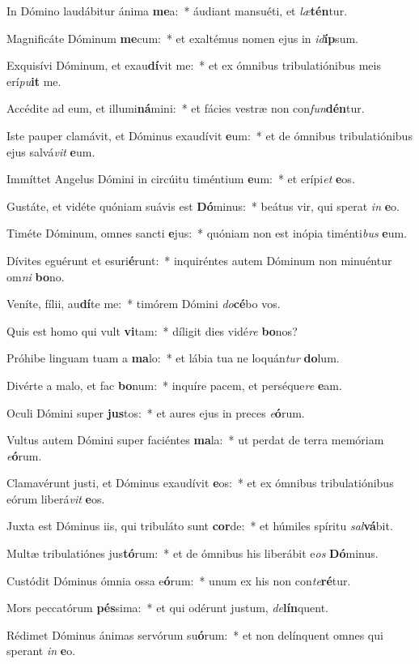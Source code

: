 \item In Dómino laudábitur ánima \textbf{me}a:~* áudiant mansuéti, et \textit{læ}\textbf{tén}tur.
\item Magnificáte Dóminum \textbf{me}cum:~* et exaltémus nomen ejus in \textit{id}\textbf{íp}sum.
\item Exquisívi Dóminum, et exau\textbf{dí}vit me:~* et ex ómnibus tribulatiónibus meis erí\textit{pu}\textbf{it} me.
\item Accédite ad eum, et illumi\textbf{ná}mini:~* et fácies vestræ non con\textit{fun}\textbf{dén}tur.
\item Iste pauper clamávit, et Dóminus exaudívit \textbf{e}um:~* et de ómnibus tribulatiónibus ejus salvá\textit{vit} \textbf{e}um.
\item Immíttet Angelus Dómini in circúitu timéntium \textbf{e}um:~* et erípi\textit{et} \textbf{e}os.
\item Gustáte, et vidéte quóniam suávis est \textbf{Dó}minus:~* beátus vir, qui sperat \textit{in} \textbf{e}o.
\item Timéte Dóminum, omnes sancti \textbf{e}jus:~* quóniam non est inópia timénti\textit{bus} \textbf{e}um.
\item Dívites eguérunt et esuri\textbf{é}runt:~* inquiréntes autem Dóminum non minuéntur om\textit{ni} \textbf{bo}no.
\item Veníte, fílii, au\textbf{dí}te me:~* timórem Dómini \textit{do}\textbf{cé}bo vos.
\item Quis est homo qui vult \textbf{vi}tam:~* díligit dies vidé\textit{re} \textbf{bo}nos?
\item Próhibe linguam tuam a \textbf{ma}lo:~* et lábia tua ne loquán\textit{tur} \textbf{do}lum.
\item Divérte a malo, et fac \textbf{bo}num:~* inquíre pacem, et perséque\textit{re} \textbf{e}am.
\item Oculi Dómini super \textbf{jus}tos:~* et aures ejus in preces \textit{e}\textbf{ó}rum.
\item Vultus autem Dómini super faciéntes \textbf{ma}la:~* ut perdat de terra memóriam \textit{e}\textbf{ó}rum.
\item Clamavérunt justi, et Dóminus exaudívit \textbf{e}os:~* et ex ómnibus tribulatiónibus eórum liberá\textit{vit} \textbf{e}os.
\item Juxta est Dóminus iis, qui tribuláto sunt \textbf{cor}de:~* et húmiles spíritu \textit{sal}\textbf{vá}bit.
\item Multæ tribulatiónes jus\textbf{tó}rum:~* et de ómnibus his liberábit e\textit{os} \textbf{Dó}minus.
\item Custódit Dóminus ómnia ossa e\textbf{ó}rum:~* unum ex his non con\textit{te}\textbf{ré}tur.
\item Mors peccatórum \textbf{pés}sima:~* et qui odérunt justum, \textit{de}\textbf{lín}quent.
\item Rédimet Dóminus ánimas servórum su\textbf{ó}rum:~* et non delínquent omnes qui sperant \textit{in} \textbf{e}o.
